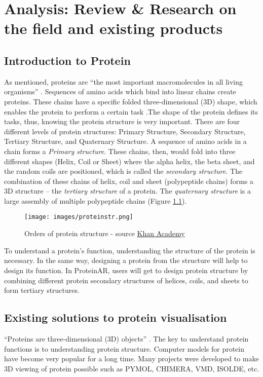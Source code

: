 \chapter{Analysis: Review \& Research on the field and existing products}
\label{ch:litRev}

\section{Introduction to Protein}

As mentioned, proteins are “the most important macromolecules in all living organisms” \parencite{rashid_protein_nodate}. Sequences of amino acids which bind into linear chains create proteins. These chains have a specific folded three-dimensional (3D) shape, which enables the protein to perform a certain task \parencite{rashid_protein_nodate}.The shape of the protein defines its tasks, thus, knowing the protein structure is very important. There are four different levels of protein structures: Primary Structure, Secondary Structure, Tertiary Structure, and Quaternary Structure. A sequence of amino acids in a chain forms a \emph{Primary structure}. These chains, then, would fold into three different shapes (Helix, Coil or Sheet) where the alpha helix, the beta sheet, and the random coils are positioned, which is called the \emph{secondary structure}. The combination of these chains of helix, coil and sheet (polypeptide chains) forms a 3D structure – the \emph{tertiary structure} of a protein. The \emph{quaternary structure} is a large assembly of multiple polypeptide chains (Figure \ref{fig:proteinstr}).
 \begin{figure}[!htp]
	\centering
	\texttt{[image: images/proteinstr.png]}
	\caption{Orders of protein structure - source \href{https://www.khanacademy.org/science/biology/macromolecules/proteins-and-amino-acids/a/orders-of-protein-structure}{Khan Academy}\parencite{noauthor_introduction_nodate}}
	\label{fig:proteinstr}
\end{figure}

To understand a protein’s function, understanding the structure of the protein is necessary. In the same way, designing a protein from the structure will help to design its function. 
In ProteinAR, users will get to design protein structure by combining different protein secondary structures of helices, coils, and sheets to form tertiary structures. 


\section{Existing solutions to protein visualisation}
 “Proteins are three-dimensional (3D) objects” \parencite{ratamero_touching_2018}. The key to understand protein functions is to understanding protein structure. Computer models for protein have become very popular for a long time. Many projects were developed to make 3D viewing of protein possible such as {\footnotesize PYMOL, CHIMERA, VMD, ISOLDE,} etc. 
 
